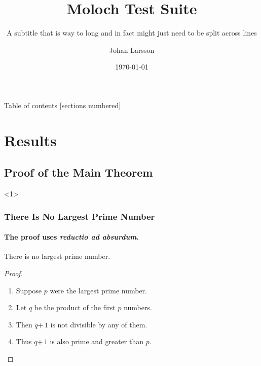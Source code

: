 

\title{Moloch Test Suite}
\subtitle{A subtitle that is way to long and in fact might just need to be split across lines}

\author[Johan]{Johan Larsson}
\date{\today}



\START
\showoutput

\begin{frame}{Table of contents}
  [sections numbered]
  \tableofcontents[hideallsubsections]
\end{frame}

\vfil\break
\END

\START
\showoutput

\section{Results}

\vfil\break
\END

\START
\showoutput

\subsection{Proof of the Main Theorem}

\begin{frame}<1>
  \frametitle{There Is No Largest Prime Number}
  \framesubtitle{The proof uses \textit{reductio ad absurdum}.}

  \begin{theorem}
    There is no largest prime number.
  \end{theorem}
  \begin{proof}
    \begin{enumerate}
      \item<1-| alert@1> Suppose $p$ were the largest prime number.
      \item<2-> Let $q$ be the product of the first $p$ numbers.
      \item<3-> Then $q$\;+\,$1$ is not divisible by any of them.
      \item<1-> Thus $q$\;+\,$1$ is also prime and greater than $p$.\qedhere
    \end{enumerate}
  \end{proof}
\end{frame}

\vfil\break
\END

